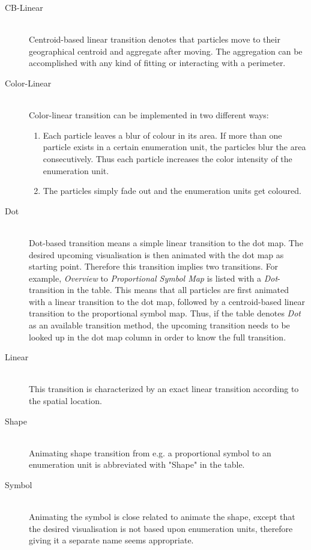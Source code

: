 \begin{description}

\item[CB-Linear] \hfill \\
Centroid-based linear transition denotes that particles move to their geographical centroid and aggregate after moving. The aggregation can be accomplished with any kind of fitting or interacting with a perimeter.

\item[Color-Linear] \hfill \\
Color-linear transition can be implemented in two different ways:
\begin{enumerate}
\item Each particle leaves a blur of colour in its area. If more than one particle exists in a certain enumeration unit, the particles blur the area consecutively. Thus each particle increases the color intensity of the enumeration unit.
\item The particles simply fade out and the enumeration units get coloured.
\end{enumerate}

\item[Dot] \hfill \\
Dot-based transition means a simple linear transition to the dot map. The desired upcoming visualisation is then animated with the dot map as starting point. Therefore this transition implies two transitions. For example, \textit{Overview} to \textit{Proportional Symbol Map} is listed with a \textit{Dot}-transition in the table. This means that all particles are first animated with a linear transition to the dot map, followed by a centroid-based linear transition to the proportional symbol map. Thus, if the table denotes \textit{Dot} as an available transition method, the upcoming transition needs to be looked up in the dot map column in order to know the full transition.

\item[Linear] \hfill \\
This transition is characterized by an exact linear transition according to the spatial location.

\item[Shape] \hfill \\
Animating shape transition from e.g. a proportional symbol to an enumeration unit is abbreviated with "Shape" in the table.

\item[Symbol] \hfill \\
Animating the symbol is close related to animate the shape, except that the desired visualisation is not based upon enumeration units, therefore giving it a separate name seems appropriate.

\end{description}


